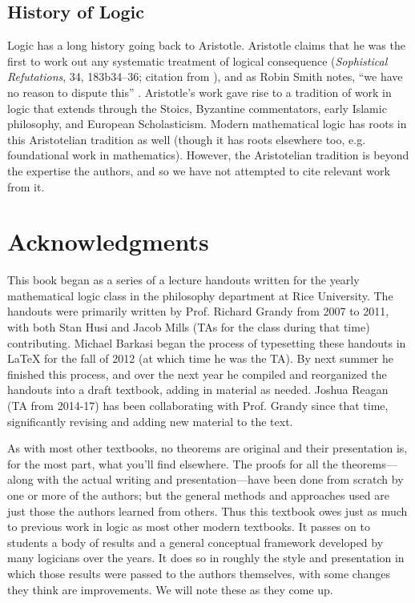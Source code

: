 \documentclass[11pt,fleqn,twoside,openright]{report}%
\let\origdoublepage\cleardoublepage
\newcommand{\clearemptydoublepage}{%
  \clearpage
  {\pagestyle{empty}\origdoublepage}%
}
\let\cleardoublepage\clearemptydoublepage
\begin{document}
\section*{History of Logic}

Logic has a long history going back to Aristotle. 
Aristotle claims that he was the first to work out any systematic treatment of logical consequence (\emph{Sophistical Refutations}, 34, 183b34--36; citation from \citealp[27]{Smith1995}), and as Robin Smith notes, ``we have no reason to dispute this'' \citeyearpar[27]{Smith1995}.
Aristotle's work gave rise to a tradition of work in logic that extends through the Stoics, Byzantine commentators, early Islamic philosophy, and European Scholasticism. 
Modern mathematical logic has roots in this Aristotelian tradition as well (though it has roots elsewhere too, e.g. foundational work in mathematics). 
However, the Aristotelian tradition is beyond the expertise the authors, and so we have not attempted to cite relevant work from it. 

\newpage%
\clearemptydoublepage

\chapter*{Acknowledgments}

\noindent{}This book began as a series of a lecture handouts written for the yearly mathematical logic class in the philosophy department at Rice University. 
The handouts were primarily written by Prof. Richard Grandy from 2007 to 2011, with both Stan Husi and Jacob Mills (TAs for the class during that time) contributing. 
Michael Barkasi began the process of typesetting these handouts in \LaTeX{} for the fall of 2012 (at which time he was the TA).
By next summer he finished this process, and over the next year he compiled and reorganized the handouts into a draft textbook, adding in material as needed. 
Joshua Reagan (TA from 2014-17) has been collaborating with Prof. Grandy since that time, significantly revising and adding new material to the text.

As with most other textbooks, no theorems are original and their presentation is, for the most part, what you'll find elsewhere. 
The proofs for all the theorems---along with the actual writing and presentation---have been done from scratch by one or more of the authors; 
but the general methods and approaches used are just those the authors learned from others. 
Thus this textbook owes just as much to previous work in logic as most other modern textbooks. It passes on to students a body of results and a general conceptual framework developed by many logicians over the years. 
It does so in roughly the style and presentation in which those results were passed to the authors themselves, with some changes they think are improvements. 
We will note these as they come up. 
\end{document}
